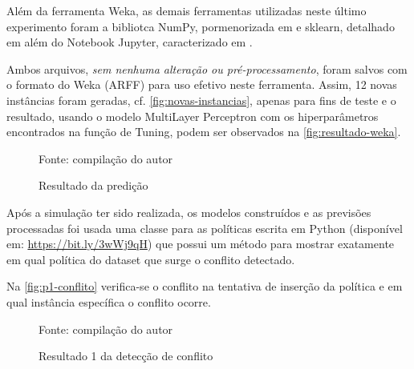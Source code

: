 Além da ferramenta Weka, as demais ferramentas utilizadas neste último experimento foram a bibliotca NumPy, pormenorizada em  e sklearn, detalhado em  além do Notebook Jupyter, caracterizado em . 

Ambos arquivos, \textit{sem nenhuma alteração ou pré-processamento}, foram salvos com o formato do Weka (ARFF) para uso efetivo neste ferramenta. Assim, 12 novas instâncias foram geradas, cf. \autoref{fig:novas-instancias}, apenas para fins de teste e o resultado, usando o modelo MultiLayer Perceptron com os hiperparâmetros encontrados na função de Tuning, podem ser observados na \autoref{fig:resultado-weka}.

\begin{figure}[h!]
	\centering
	\caption{Resultado da predição}
	
	\label{fig:resultado-weka}
	{\scriptsize Fonte: compilação do autor}
\end{figure}

Após a simulação ter sido realizada, os modelos construídos e as previsões processadas foi usada uma classe para as políticas escrita em Python (disponível em: \url{https://bit.ly/3wWj9qH}) que possui um método para mostrar exatamente em qual política do dataset que surge o conflito detectado. 

Na \autoref{fig:p1-conflito} verifica-se o conflito na tentativa de inserção da política e em qual instância específica o conflito ocorre.

\begin{figure}[H]
	\centering
	\caption{Resultado 1 da detecção de conflito}
	
	\label{fig:p1-conflito}
	{\scriptsize Fonte: compilação do autor}
\end{figure} 

